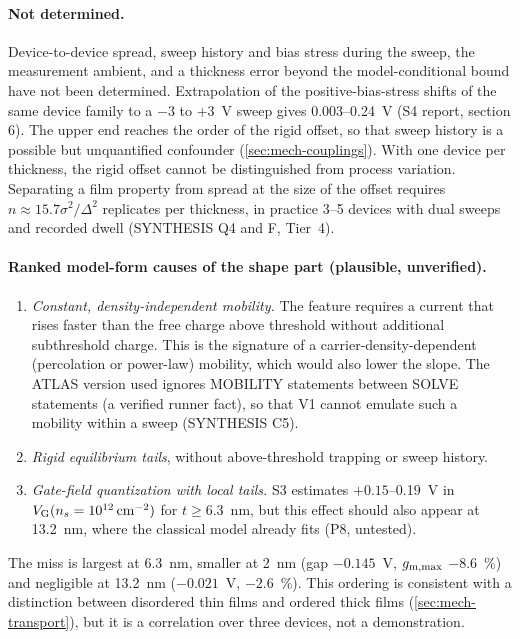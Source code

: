 \paragraph{Not determined.} Device-to-device spread, sweep history and bias stress during the sweep, the measurement ambient, and a thickness error beyond the model-conditional bound have not been determined. Extrapolation of the positive-bias-stress shifts of the same device family \citep[p.~9]{Januar2026} to a $-3$ to $+3$~V sweep gives 0.003--0.24~V (S4 report, section 6). The upper end reaches the order of the rigid offset, so that sweep history is a possible but unquantified confounder (\cref{sec:mech-couplings}). With one device per thickness, the rigid offset cannot be distinguished from process variation. Separating a film property from spread at the size of the offset requires $n\approx15.7\sigma^2/\Delta^2$ replicates per thickness, in practice 3--5 devices with dual sweeps and recorded dwell (SYNTHESIS Q4 and F, Tier~4).

\paragraph{Ranked model-form causes of the shape part (plausible, unverified).}
\begin{enumerate}
\item \emph{Constant, density-independent mobility.} The feature requires a current that rises faster than the free charge above threshold without additional subthreshold charge. This is the signature of a carrier-density-dependent (percolation or power-law) mobility, which would also lower the slope. The ATLAS version used ignores MOBILITY statements between SOLVE statements (a verified runner fact), so that V1 cannot emulate such a mobility within a sweep (SYNTHESIS C5).
\item \emph{Rigid equilibrium tails}, without above-threshold trapping or sweep history.
\item \emph{Gate-field quantization with local tails.} S3 estimates $+0.15$--0.19~V in $V_{\mathrm{G}}(n_s=10^{12}\,\mathrm{cm}^{-2})$ for $t\ge6.3$~nm, but this effect should also appear at 13.2~nm, where the classical model already fits (P8, untested).
\end{enumerate}
The miss is largest at 6.3~nm, smaller at 2~nm (gap $-0.145$~V, $g_{\mathrm{m,max}}$ $-8.6$~\%) and negligible at 13.2~nm ($-0.021$~V, $-2.6$~\%). This ordering is consistent with a distinction between disordered thin films and ordered thick films (\cref{sec:mech-transport}), but it is a correlation over three devices, not a demonstration.

